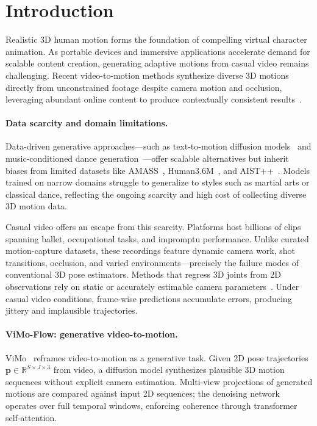 \section{Introduction}
\label{sec:intro}

Realistic 3D human motion forms the foundation of compelling virtual character animation. As portable devices and immersive applications accelerate demand for scalable content creation, generating adaptive motions from casual video remains challenging. Recent video-to-motion methods synthesize diverse 3D motions directly from unconstrained footage despite camera motion and occlusion, leveraging abundant online content to produce contextually consistent results~\cite{vimo2024}.

\paragraph{Data scarcity and domain limitations.}
Data-driven generative approaches---such as text-to-motion diffusion models~\cite{motiondiffuse2022} and music-conditioned dance generation~\cite{edge2023}---offer scalable alternatives but inherit biases from limited datasets like AMASS~\cite{amass2019}, Human3.6M~\cite{h3wb2014}, and AIST++~\cite{aist2021}. Models trained on narrow domains struggle to generalize to styles such as martial arts or classical dance, reflecting the ongoing scarcity and high cost of collecting diverse 3D motion data.

Casual video offers an escape from this scarcity. Platforms host billions of clips spanning ballet, occupational tasks, and impromptu performance. Unlike curated motion-capture datasets, these recordings feature dynamic camera work, shot transitions, occlusion, and varied environments---precisely the failure modes of conventional 3D pose estimators. Methods that regress 3D joints from 2D observations rely on static or accurately estimable camera parameters~\cite{motionbert2023, glamr2022}. Under casual video conditions, frame-wise predictions accumulate errors, producing jittery and implausible trajectories.

\paragraph{ViMo-Flow: generative video-to-motion.}
ViMo~\cite{vimo2024} reframes video-to-motion as a generative task. Given 2D pose trajectories $\mathbf{p} \in \mathbb{R}^{S \times J \times 3}$ from video, a diffusion model synthesizes plausible 3D motion sequences without explicit camera estimation. Multi-view projections of generated motions are compared against input 2D sequences; the denoising network operates over full temporal windows, enforcing coherence through transformer self-attention.

